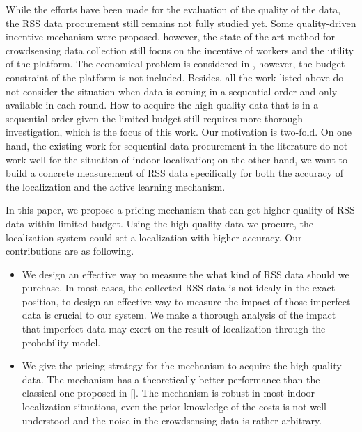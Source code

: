 \documentclass[10pt,conference,compsocconf,letterpaper]{IEEEtran}
\begin{document}
While the efforts have been made for the evaluation of the quality of the data, the RSS data procurement still remains not fully studied yet. Some quality-driven incentive mechanism\cite{Lbs2, noise,Pengdan15, incentive, Incentive2} were proposed, however, the state of the art method for crowdsensing data collection still focus on the incentive of workers and the utility of the platform. The economical problem is considered in \cite{Pengdan15}, however, the budget constraint of the platform is not included. Besides, all the work listed above do not consider the situation when data is coming in a sequential order and only available in each round. How to acquire the high-quality data that is in a sequential order given the limited budget still requires more thorough investigation, which is the focus of this work. Our motivation is two-fold. On one hand, the existing work for sequential data procurement in the literature \cite{abernethy2015low}do not work well for the situation of indoor localization; on the other hand, we want to build a concrete measurement of RSS data specifically for both the accuracy of the localization and the active learning mechanism. 

In this paper, we propose a pricing mechanism that can get higher quality of RSS data within limited budget. Using the high quality data we procure, the localization system could set a localization with higher accuracy. Our contributions are as following.


\begin{itemize}

\item  We design an effective way to measure the what kind of RSS data should we purchase. In most cases, the collected RSS data is not idealy in the exact position, to design an effective way to measure the impact of those imperfect data is crucial to our system. We make a thorough analysis of the impact that imperfect data may exert on the result of localization through the  probability model. 

\item We give the pricing strategy for the mechanism to acquire the high quality data. The mechanism has a theoretically better performance than the classical one proposed in \ref{}. The mechanism is robust in most indoor-localization situations, even the prior knowledge of the costs is not well understood and the noise in the crowdsensing data is rather arbitrary. 

\end{itemize}
\end{document}
